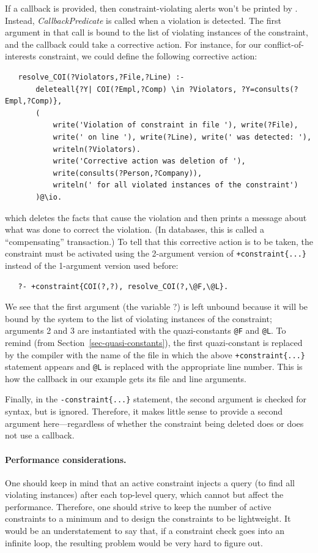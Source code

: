 If a callback is provided, then constraint-violating alerts won't be
printed  by \ERGO. Instead, \textit{CallbackPredicate} is called when
a violation is detected. The first argument in that call is
bound to the list of
violating instances of the constraint, and the callback could take a
corrective action. For instance, for our conflict-of-interests constraint, we could
define the following corrective action:
\begin{verbatim}
   resolve_COI(?Violators,?File,?Line) :-
       deleteall{?Y| COI(?Empl,?Comp) \in ?Violators, ?Y=consults(?Empl,?Comp)},
       (
           write('Violation of constraint in file '), write(?File),
           write(' on line '), write(?Line), write(' was detected: '),
           writeln(?Violators).
           write('Corrective action was deletion of '),
           write(consults(?Person,?Company)),
           writeln(' for all violated instances of the constraint')
       )@\io.
\end{verbatim}
which deletes the facts that cause the violation and then
prints a message about what was done to correct the violation. (In
databases, this is called a ``compensating'' transaction.)
To tell \ERGO that this corrective action is to be taken, the constraint
must be activated using the 2-argument version of
\texttt{+constraint\{...\}}  
instead of the 1-argument version used before:
\begin{verbatim}
   ?- +constraint{COI(?,?), resolve_COI(?,\@F,\@L}.
\end{verbatim}
We see that the first argument (the variable ?) is left unbound because it will be bound
by the system to the list of violating instances of the constraint; arguments 2
and 3 are instantiated with the quazi-constants \texttt{\bs{}@F} and
\texttt{\bs{}@L}. To remind (from Section~\ref{sec-quasi-constants}),
the first quazi-constant is replaced by the
compiler with the name of the file in which the above
\texttt{+constraint\{...\}} statement appears and \texttt{\bs{}@L} is
replaced with the appropriate line number. This is how the callback
in our example gets its file and line arguments.

Finally, in the \texttt{-constraint\{...\}} statement, the second argument
is checked for syntax, but is ignored. Therefore,
it makes little sense to provide a second argument here---regardless of whether the constraint being deleted does or does not use a
callback.

\paragraph{Performance considerations.}
One should keep in mind that an active constraint injects a query (to find
all violating instances) after each top-level query, which cannot but
affect the performance. Therefore, one should strive to keep the number of
active constraints to a minimum and to design the constraints to be
lightweight. It would be an understatement to say that,
if a constraint check goes into an
infinite loop, the resulting problem would be very hard to figure out.



